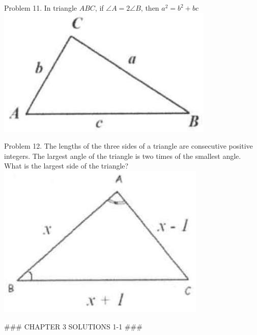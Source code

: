 \documentclass[10pt]{article}
\begin{document}
Problem 11. In triangle \(A B C\), if \(\angle A=2 \angle B\), then \(a^{2}=b^{2}+b c\)\\
\includegraphics[max width=\textwidth, center]{2025_04_17_97bc1f7e44d93c271a88g-066(1)}

Problem 12. The lengths of the three sides of a triangle are consecutive positive integers. The largest angle of the triangle is two times of the smallest angle. What is the largest side of the triangle?\\
\includegraphics[max width=\textwidth, center]{2025_04_17_97bc1f7e44d93c271a88g-066(3)}


### CHAPTER 3 SOLUTIONS 1-1 ###
\end{document}
